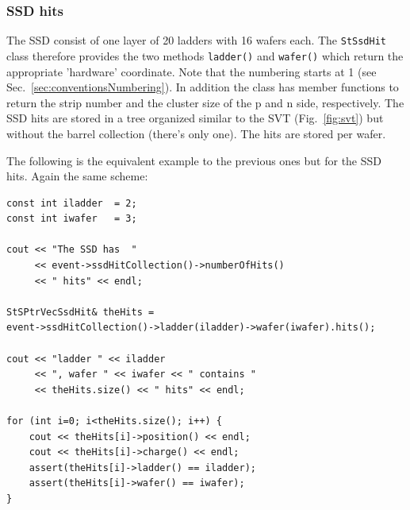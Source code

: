 \documentclass[twoside]{article}
\begin{document}
\subsubsection{SSD hits}
   

The SSD consist of one layer of 20 ladders with 16 wafers each.  The
\texttt{StSsdHit} class therefore provides the two methods
\texttt{ladder()} and \texttt{wafer()} which return the appropriate
'hardware' coordinate. Note that the numbering starts at 1 (see
Sec.~\ref{sec:conventionsNumbering}).  In addition the class has
member functions to return the strip number and the cluster size of
the p and n side, respectively.  The SSD hits are stored in a tree
organized similar to the SVT (Fig.~\ref{fig:svt}) but without the
barrel collection (there's only one).  The hits are stored per wafer.

The following is the equivalent example to the previous ones but for the SSD hits.
Again the same scheme:
\begin{verbatim}
const int iladder  = 2;
const int iwafer   = 3;

cout << "The SSD has  " 
     << event->ssdHitCollection()->numberOfHits()
     << " hits" << endl;

StSPtrVecSsdHit& theHits =
event->ssdHitCollection()->ladder(iladder)->wafer(iwafer).hits();

cout << "ladder " << iladder
     << ", wafer " << iwafer << " contains "
     << theHits.size() << " hits" << endl;

for (int i=0; i<theHits.size(); i++) {
    cout << theHits[i]->position() << endl;
    cout << theHits[i]->charge() << endl;
    assert(theHits[i]->ladder() == iladder);
    assert(theHits[i]->wafer() == iwafer);
}
\end{verbatim}
\end{document}
